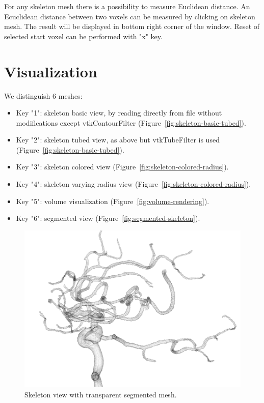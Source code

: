 For any skeleton mesh there is a possibility to measure Euclidean distance. An Ecuclidean distance between two voxels can be measured by clicking on skeleton mesh. The result will be displayed in bottom right corner of the window. Reset of selected start voxel can be performed with "x" key.

\section{Visualization}

We distinguish 6 meshes:
\begin{itemize}
	\item Key "1": skeleton basic view, by reading directly from file without modifications except vtkContourFilter (Figure~\ref{fig:skeleton-basic-tubed}).
	\item Key "2": skeleton tubed view, as above but vtkTubeFilter is used (Figure~\ref{fig:skeleton-basic-tubed}).
	\item Key "3": skeleton colored view (Figure~\ref{fig:skeleton-colored-radius}).
	\item Key "4": skeleton varying radius view (Figure~\ref{fig:skeleton-colored-radius}).
	\item Key "5": volume visualization (Figure~\ref{fig:volume-rendering}).
	\item Key "6": segmented view (Figure~\ref{fig:segmented-skeleton}).
\end{itemize}

\begin{figure}
	\centering
	\includegraphics[scale=0.4]{fig/skeleton-transparent-segmented}
	\caption{Skeleton view with transparent segmented mesh.}
	\label{fig:skeleton-transparent-segmented}
\end{figure}

